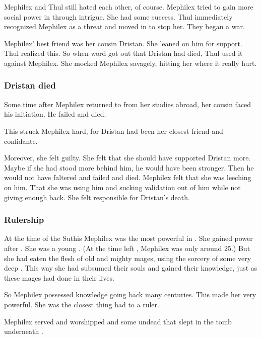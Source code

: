 Mephilex and Thul still hated each other, of course. 
Mephilex tried to gain more social power in \Yormis through intrigue. 
She had some success.
Thul immediately recognized Mephilex as a threat and moved in to stop her.
They began a war. 

Mephilex' best friend was her cousin Dristan.
She leaned on him for support. 
Thul realized this. 
So when word got out that Dristan had died, Thul used it against Mephilex.
She mocked Mephilex savagely, hitting her where it really hurt. 





\subsubsection{Dristan died}
Some time after Mephilex returned to \Yormis from her studies abroad, her cousin  faced his initiation.
He failed and died. 

This struck Mephilex hard, for Dristan had been her closest friend and confidante. 

Moreover, she felt guilty.
She felt that she should have supported Dristan more.
Maybe if she had stood more behind him, he would have been stronger.
Then he would not have faltered and failed and died. 
Mephilex felt that she was leeching on him. 
That she was using him and sucking validation out of him while not giving enough back. 
She felt responsible for Dristan's death.





\subsubsection{Rulership}
At the time of the \thirdbanewar Suthis Mephilex was the most powerful \rethyax in \Yormis. 
She gained power after .
She was a young \sphyle. 
(At the time  left \Yormis, Mephilex was only around 25.)
But she had eaten the flesh of old and mighty mages, using the sorcery of some very deep \arcana.
This way she had subsumed their souls and gained their knowledge, just as these mages had done in their lives. 

So Mephilex possessed knowledge going back many centuries. 
This made her very powerful. 
She was the closest thing \Yormis had to a ruler. 

Mephilex served and worshipped \Thessulax and some undead \ophidians that slept in the tomb underneath \Yormis. 

